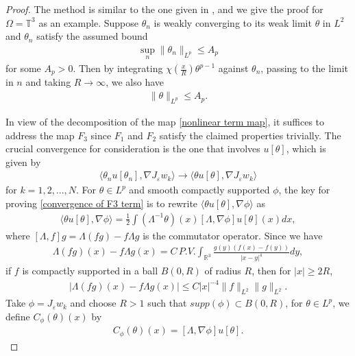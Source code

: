 \documentclass[reqno]{amsart}%
\theoremstyle{definition}
\theoremstyle{remark}
\numberwithin{equation}{section}
\newcommand{\1}{\mathbf{1}}
\newcommand{\R}{\mathbb R}
\numberwithin{equation}{section}
\numberwithin{theorem}{section}
\numberwithin{figure}{section}
\begin{document}
\begin{proof}
The method is similar to the one given in \cite{CTV14b}, and we give the proof for $\Omega=\mathbb{T}^3$ as an example. Suppose $\theta_n$ is weakly converging to its weak limit $\theta$ in $L^2$ and $\theta_n$ satisfy the assumed bound
\begin{align}\label{bound on theta n weak convergence}
\sup_{n}\|\theta_n\|_{L^p}\le A_p
\end{align}
for some $A_p>0$. Then by integrating $\chi(\frac{x}{R})\theta^{p-1}$ against $\theta_n$, passing to the limit in $n$ and taking $R\to\infty$, we also have
\begin{align}\label{bound on theta weak convergence}
\|\theta\|_{L^p}\le A_p.
\end{align}

In view of the decomposition of the map \eqref{nonlinear term map}, it suffices to address the map $F_3$ since $F_1$ and $F_2$ satisfy the claimed properties trivially. The crucial convergence for consideration is the one that involves $u[\theta]$, which is given by
\begin{align}\label{convergence of F3 term}
\langle \theta_nu[\theta_n],\nabla J_{\varepsilon}w_k\rangle \to \langle \theta u[\theta],\nabla J_{\varepsilon}w_k\rangle
\end{align}
for $k=1,2,...,N$. For $\theta\in L^p$ and smooth compactly supported $\phi$, the key for proving \eqref{convergence of F3 term} is to rewrite $\langle \theta u[\theta],\nabla \phi\rangle$ as 
\begin{align*}
\langle \theta u[\theta],\nabla \phi\rangle =\frac{1}{2}\int(\Lambda^{-1}\theta)(x)[\Lambda,\nabla \phi]u[\theta](x)dx,
\end{align*}
where $[\Lambda,f]g=\Lambda(fg)-f\Lambda g$ is the commutator operator. Since we have
\begin{align*}
\Lambda(fg)(x)-f\Lambda g(x)=C\,P.V. \int_{\R^3}\frac{g(y)(f(x)-f(y))}{|x-y|^4}dy,
\end{align*}
if $f$ is compactly supported in a ball $B(0,R)$ of radius $R$, then for $|x|\ge 2R$,
\begin{align}\label{bound on commutator}
|\Lambda(fg)(x)-f\Lambda g(x)|\le C|x|^{-4}\|f\|_{L^2}\|g\|_{L^2}.
\end{align}
Take $\phi=J_{\varepsilon}w_k$ and choose $R>1$ such that $supp(\phi)\subset B(0,R)$, for $\theta\in L^p$, we define $C_{\phi}(\theta)(x)$ by
\begin{align*}
C_{\phi}(\theta)(x)=[\Lambda,\nabla\phi]u[\theta].
\end{align*}

\end{proof}
\end{document}
